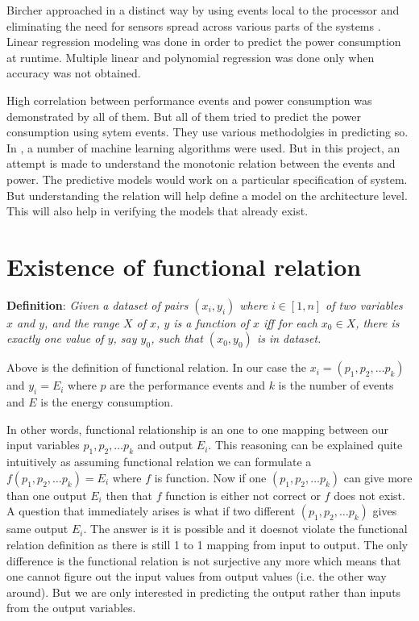 Bircher approached in a distinct way by using events local to the processor and eliminating the need for sensors spread across various parts of the systems \cite{bircher2012complete}. Linear regression modeling was done in order to predict the power consumption at runtime. Multiple linear and polynomial regression was done only when accuracy was not obtained. 

High correlation between performance events and power consumption was demonstrated by all of them. But all of them tried to predict the power consumption using sytem events. They use various methodolgies in predicting so. In \cite{yang2016performance}, a number of machine learning algorithms were used. But in this project, an attempt is made to understand the monotonic relation between the events and power. The predictive models would work on a particular specification of system. But understanding the relation will help define a model on the architecture level. This will also help in verifying the models that already exist.


\section{Existence of functional relation}

\textbf{Definition}: \textit{Given a dataset of pairs \((x_i, y_i)\) where \(i \in [1, n]\) of two variables \(x\) and \(y\), and the range \(X\) of \(x\), \(y\) is a function of \(x\) iff for each \(x_0 \in X\), there is exactly one value of \(y\), say \(y_0\), such that \((x_0, y_0)\) is in dataset.}~\cite{zembowicz1993testing}

Above is the definition of functional relation. In our case the \(x_i = (p_1, p_2, \ldots p_k)\) and \(y_i = E_i\) where \(p\) are the performance events and \(k\) is the number of events and \(E\) is the energy consumption.

In other words, functional relationship is an one to one mapping between our input variables \(p_1, p_2, \ldots p_k\) and output \(E_i\). This reasoning can be explained quite intuitively as assuming functional relation we can formulate a \(f(p_1, p_2, \ldots p_k) = E_i\) where \(f\) is function. Now if one \((p_1, p_2, \ldots p_k)\) can give more than one output \(E_i\) then that \(f\) function is either not correct or \(f\) does not exist. A question that immediately arises is what if two different \((p_1, p_2, \ldots p_k)\) gives same output \(E_i\). The answer is it is possible and it doesnot violate the functional relation definition as there is still 1 to 1 mapping from input to output. The only difference is the functional relation is not surjective any more which means that one cannot figure out the input values from output values (i.e. the other way around). But we are only interested in predicting the output rather than inputs from the output variables.

